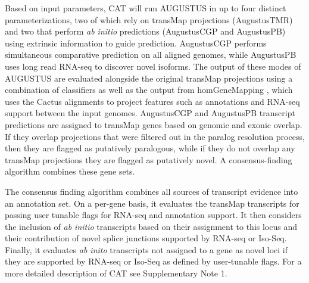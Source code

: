 \documentclass[fleqn,10pt]{wlscirep}
\begin{document}
Based on input parameters, CAT will run AUGUSTUS in up to four distinct parameterizations, two of which rely on transMap projections (AugustusTMR) and two that perform \textit{ab initio} predictions (AugustusCGP and AugustusPB) using extrinsic information to guide prediction. AugustusCGP performs simultaneous comparative prediction \cite{konig2015simultaneous} on all aligned genomes, while AugustusPB uses long read RNA-seq to discover novel isoforms. The output of these modes of AUGUSTUS are evaluated alongside the original transMap projections using a combination of classifiers as well as the output from homGeneMapping \cite{stanke2004augustus}, which uses the Cactus alignments to project features such as annotations and RNA-seq support between the input genomes. AugustusCGP and AugustusPB transcript predictions are assigned to transMap genes based on genomic and exonic overlap. If they overlap projections that were filtered out in the paralog resolution process, then they are flagged as putatively paralogous, while if they do not overlap any transMap projections they are flagged as putatively novel. A consensus-finding algorithm combines these gene sets.

The consensus finding algorithm combines all sources of transcript evidence into an annotation set. On a per-gene basis, it evaluates the transMap transcripts for passing user tunable flags for RNA-seq and annotation support. It then considers the inclusion of \textit{ab initio} transcripts based on their assignment to this locus and their contribution of novel splice junctions supported by RNA-seq or Iso-Seq. Finally, it evaluates \textit{ab inito} transcripts not assigned to a gene as novel loci if they are supported by RNA-seq or Iso-Seq as defined by user-tunable flags. For a more detailed description of CAT see Supplementary Note 1.
\end{document}
